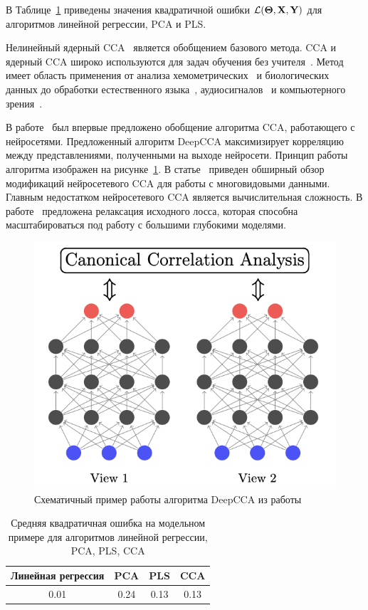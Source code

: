 В Таблице~\ref{ch1:tbl:toy_example_results} приведены значения квадратичной ошибки $\mathcal{L}(\boldsymbol{\Theta}, \mathbf{X}, \mathbf{Y})$ для алгоритмов линейной регрессии, PCA и PLS.

Нелинейный ядерный CCA~\cite{akaho2006kernel,melzer2001nonlinear,bach2002kernel,hardoon2004canonical} является обобщением базового метода. 
CCA и ядерный CCA широко используются для задач обучения без учителя~\cite{hardoon2007unsupervised,vinokourov2003inferring}. 
Метод имеет область применения от анализа хемометрических~\cite{montanarella1995chemometric} и биологических~\cite{vert2003graph} данных до обработки естественного языка~\cite{haghighi2008learning,dhillon2011multi}, аудиосигналов~\cite{choukri1986adaptation,rudzicz2010adaptive} и компьютерного зрения~\cite{kim2007tensor}.

В работе~\cite{andrew2013deep} был впервые предложено обобщение алгоритма CCA, работающего с нейросетями. 
Предложенный алгоритм DeepCCA максимизирует корреляцию между представлениями, полученными на выходе нейросети. 
Принцип работы алгоритма изображен на рисунке~\ref{ch1:fig:deepcca_schema}.
В статье~\cite{wang2015deep} приведен обширный обзор модификаций нейросетевого CCA для работы с многовидовыми данными.
Главным недостатком нейросетевого CCA является вычислительная сложность. 
В работе~\cite{chang2018scalable} предложена релаксация исходного лосса, которая способна масштабироваться под работу с большими глубокими моделями.

\begin{figure}[h]
	\centering
	\includegraphics[width=0.5\linewidth]{figs/ch1/deepcca_schema}
	\caption{Схематичный пример работы алгоритма DeepCCA из работы~\cite{andrew2013deep}}
	\label{ch1:fig:deepcca_schema}
\end{figure}

\begin{table}[]
	\centering
	\begin{tabular}{|c|c|c|c|}
		\hline
		\textbf{Линейная регрессия} & \textbf{PCA}   & \textbf{PLS}  &  \textbf{CCA}  \\ \hline
		0.01 &  0.24   &  0.13 &  0.13 \\ \hline
	\end{tabular}
	\caption{Средняя квадратичная ошибка на модельном примере для алгоритмов линейной регрессии, PCA, PLS, CCA}
	\label{ch1:tbl:toy_example_results}
\end{table} 


